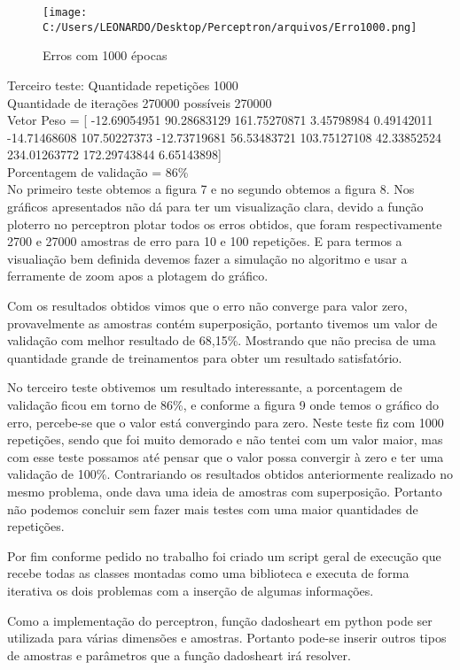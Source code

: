 \documentclass[
12pt, 
a4paper,
oneside,			%
english,			%
french,				%
spanish,			%
brazil,	
]{abntex2}
\begin{document}
\begin{figure}
	\centering
	\texttt{[image: C:/Users/LEONARDO/Desktop/Perceptron/arquivos/Erro1000.png]}
	\caption{Erros com 1000 épocas}
\end{figure}

Terceiro teste:
Quantidade repetições 1000\\
Quantidade de iterações 270000 possíveis 270000\\
Vetor Peso = [ -12.69054951   90.28683129  161.75270871    3.45798984    0.49142011 -14.71468608  107.50227373  -12.73719681   56.53483721 103.75127108 42.33852524  234.01263772  172.29743844    6.65143898]\\
Porcentagem de validação = 86\%\\

No primeiro teste obtemos a figura 7 e no segundo obtemos a figura 8. Nos gráficos apresentados não dá para ter um visualização clara, devido a função ploterro no perceptron plotar todos os erros obtidos, que foram respectivamente 2700 e 27000 amostras de erro para 10 e 100 repetições. E para termos a visualiação bem definida devemos fazer a simulação no algoritmo e usar a ferramente de zoom apos a plotagem do gráfico.

Com os resultados obtidos vimos que o erro não converge para valor zero, provavelmente as amostras contém superposição, portanto tivemos um valor de validação com melhor resultado de 68,15\%. Mostrando que não precisa de uma quantidade grande de treinamentos para obter um resultado satisfatório. 

No terceiro teste obtivemos um resultado interessante, a porcentagem de validação ficou em torno de 86\%, e conforme a figura 9 onde temos o gráfico do erro, percebe-se que o valor está convergindo para zero. Neste teste fiz com 1000 repetições, sendo que foi muito demorado e não tentei com um valor maior, mas com esse teste possamos até pensar que o valor possa convergir à zero e ter uma validação de 100\%. Contrariando os resultados obtidos anteriormente realizado no mesmo problema, onde dava uma ideia de amostras com superposição. Portanto não podemos concluir sem fazer mais testes com uma maior quantidades de repetições. 

Por fim conforme pedido no trabalho foi criado um script geral de execução que recebe todas as classes montadas como uma biblioteca e executa de forma iterativa os dois problemas com a inserção de algumas informações.  
 
Como a implementação do perceptron, função dadosheart em python pode ser utilizada para várias dimensões e amostras. Portanto pode-se inserir outros tipos de amostras e parâmetros que a função dadosheart irá resolver.
\end{document}
